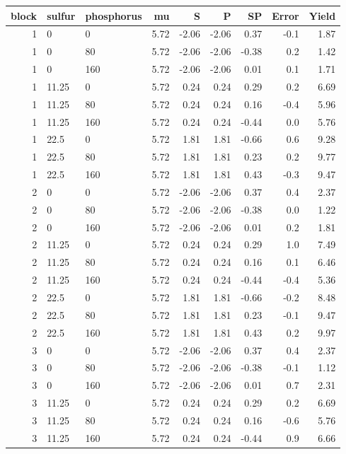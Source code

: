 \documentclass[
]{book}
\begin{document}
\begin{tabular}{r|l|l|r|r|r|r|r|r}
\hline
block & sulfur & phosphorus & mu & S & P & SP & Error & Yield\\
\hline
1 & 0 & 0 & 5.72 & -2.06 & -2.06 & 0.37 & -0.1 & 1.87\\
\hline
1 & 0 & 80 & 5.72 & -2.06 & -2.06 & -0.38 & 0.2 & 1.42\\
\hline
1 & 0 & 160 & 5.72 & -2.06 & -2.06 & 0.01 & 0.1 & 1.71\\
\hline
1 & 11.25 & 0 & 5.72 & 0.24 & 0.24 & 0.29 & 0.2 & 6.69\\
\hline
1 & 11.25 & 80 & 5.72 & 0.24 & 0.24 & 0.16 & -0.4 & 5.96\\
\hline
1 & 11.25 & 160 & 5.72 & 0.24 & 0.24 & -0.44 & 0.0 & 5.76\\
\hline
1 & 22.5 & 0 & 5.72 & 1.81 & 1.81 & -0.66 & 0.6 & 9.28\\
\hline
1 & 22.5 & 80 & 5.72 & 1.81 & 1.81 & 0.23 & 0.2 & 9.77\\
\hline
1 & 22.5 & 160 & 5.72 & 1.81 & 1.81 & 0.43 & -0.3 & 9.47\\
\hline
2 & 0 & 0 & 5.72 & -2.06 & -2.06 & 0.37 & 0.4 & 2.37\\
\hline
2 & 0 & 80 & 5.72 & -2.06 & -2.06 & -0.38 & 0.0 & 1.22\\
\hline
2 & 0 & 160 & 5.72 & -2.06 & -2.06 & 0.01 & 0.2 & 1.81\\
\hline
2 & 11.25 & 0 & 5.72 & 0.24 & 0.24 & 0.29 & 1.0 & 7.49\\
\hline
2 & 11.25 & 80 & 5.72 & 0.24 & 0.24 & 0.16 & 0.1 & 6.46\\
\hline
2 & 11.25 & 160 & 5.72 & 0.24 & 0.24 & -0.44 & -0.4 & 5.36\\
\hline
2 & 22.5 & 0 & 5.72 & 1.81 & 1.81 & -0.66 & -0.2 & 8.48\\
\hline
2 & 22.5 & 80 & 5.72 & 1.81 & 1.81 & 0.23 & -0.1 & 9.47\\
\hline
2 & 22.5 & 160 & 5.72 & 1.81 & 1.81 & 0.43 & 0.2 & 9.97\\
\hline
3 & 0 & 0 & 5.72 & -2.06 & -2.06 & 0.37 & 0.4 & 2.37\\
\hline
3 & 0 & 80 & 5.72 & -2.06 & -2.06 & -0.38 & -0.1 & 1.12\\
\hline
3 & 0 & 160 & 5.72 & -2.06 & -2.06 & 0.01 & 0.7 & 2.31\\
\hline
3 & 11.25 & 0 & 5.72 & 0.24 & 0.24 & 0.29 & 0.2 & 6.69\\
\hline
3 & 11.25 & 80 & 5.72 & 0.24 & 0.24 & 0.16 & -0.6 & 5.76\\
\hline
3 & 11.25 & 160 & 5.72 & 0.24 & 0.24 & -0.44 & 0.9 & 6.66\\

\end{tabular}
\end{document}
